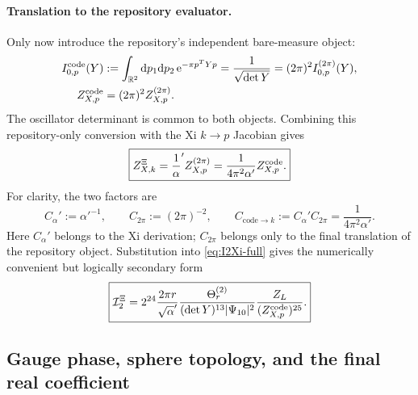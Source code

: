 \documentclass[11pt]{article}
\numberwithin{equation}{section}
\newcommand{\A}{\alpha'}
\newcommand{\dd}{\mathrm d}
\newcommand{\ee}{\mathrm e}
\newcommand{\cI}{\mathcal I}
\begin{document}
\paragraph{Translation to the repository evaluator.}
Only now introduce the repository's independent bare-measure object:
\begin{align}
 I_{0,p}^{\rm code}(Y)
 &:=\int_{\mathbb R^2}\dd p_1\dd p_2\,\ee^{-\pi p^TYp}
 =\frac1{\sqrt{\det Y}}
 =(2\pi)^2 I_{0,p}^{(2\pi)}(Y),
 \label{eq:p-zero-mode-integral}\\
 Z_{X,p}^{\rm code}&=(2\pi)^2Z_{X,p}^{(2\pi)}.
 \label{eq:code-vs-xip-scalar}
\end{align}
The oscillator determinant is common to both objects.  Combining this
repository-only conversion with the Xi $k\to p$ Jacobian gives
\begin{equation}
 \boxed{
 Z_{X,k}^\Xi
 =\frac1\A Z_{X,p}^{(2\pi)}
 =\frac1{4\pi^2\A}Z_{X,p}^{\rm code}.}
 \label{eq:code-to-xi-scalar}
\end{equation}
For clarity, the two factors are
\begin{equation}
 C_\A:=\A^{-1},
 \qquad C_{2\pi}:=(2\pi)^{-2},
 \qquad C_{\mathrm{code}\to k}:=C_\A C_{2\pi}
 =\frac1{4\pi^2\A}.
 \label{eq:two-scalar-conversions}
\end{equation}
Here $C_\A$ belongs to the Xi derivation; $C_{2\pi}$ belongs only to the final
translation of the repository object.  Substitution into
\eqref{eq:I2Xi-full} gives the numerically convenient but logically secondary
form
\begin{equation}
 \boxed{
 \cI_2^\Xi
 =2^{24}\frac{2\pi r}{\sqrt\A}
 \frac{\Theta_r^{(2)}}{(\det Y)^{13}|\Psi_{10}|^2}
 \frac{Z_L}{(Z_{X,p}^{\rm code})^{25}}.}
 \label{eq:I2Xi-xip-form}
\end{equation}

\subsection{Gauge phase, sphere topology, and the final real coefficient}
\end{document}
